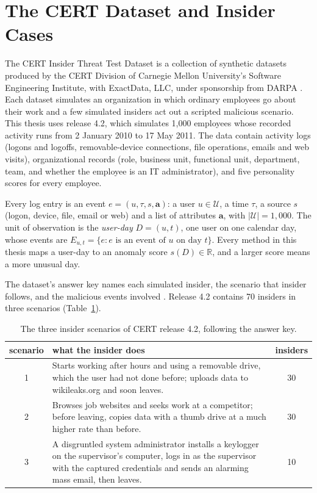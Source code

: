 \documentclass[12pt]{report}
\begin{document}
\FloatBarrier
\section{The CERT Dataset and Insider Cases}
\label{sec:cert}
The CERT Insider Threat Test Dataset is a collection of synthetic datasets produced by the CERT
Division of Carnegie Mellon University's Software Engineering Institute, with ExactData, LLC,
under sponsorship from DARPA \cite{glasser2013,certdataset2016}. Each dataset simulates an
organization in which ordinary employees go about their work and a few simulated insiders act out
a scripted malicious scenario. This thesis uses release 4.2, which simulates 1,000 employees whose
recorded activity runs from 2 January 2010 to 17 May 2011. The data contain activity logs
(logons and logoffs, removable-device connections, file operations, emails and web visits),
organizational records (role, business unit, functional unit, department, team, and whether the
employee is an IT administrator), and five personality scores for every employee.

Every log entry is an event $e = (u, \tau, s, \mathbf{a})$: a user $u \in \mathcal{U}$, a time
$\tau$, a source $s$ (logon, device, file, email or web) and a list of attributes $\mathbf{a}$,
with $|\mathcal{U}| = 1{,}000$. The unit of observation is the \emph{user-day} $D = (u, t)$, one
user on one calendar day, whose events are $E_{u,t} = \{ e : e \text{ is an event of } u \text{ on
day } t\}$. Every method in this thesis maps a user-day to an anomaly score $s(D) \in \mathbb{R}$,
and a larger score means a more unusual day.



\label{sec:insider-case}
The dataset's answer key names each simulated insider, the scenario that insider follows, and the
malicious events involved \cite{certdataset2016}. Release 4.2 contains 70 insiders in three
scenarios (Table~\ref{tab:scenarios}).

\begin{table}[H]
\centering
\caption{The three insider scenarios of CERT release 4.2, following the answer key.}
\label{tab:scenarios}
\begin{tabular}{c p{10.8cm} c}
\toprule
scenario & what the insider does & insiders \\
\midrule
1 & Starts working after hours and using a removable drive, which the user had not done before;
uploads data to wikileaks.org and soon leaves. & 30 \\
2 & Browses job websites and seeks work at a competitor; before leaving, copies data with a thumb
drive at a much higher rate than before. & 30 \\
3 & A disgruntled system administrator installs a keylogger on the supervisor's computer, logs in
as the supervisor with the captured credentials and sends an alarming mass email, then leaves. & 10 \\
\bottomrule
\end{tabular}
\end{table}
\end{document}
